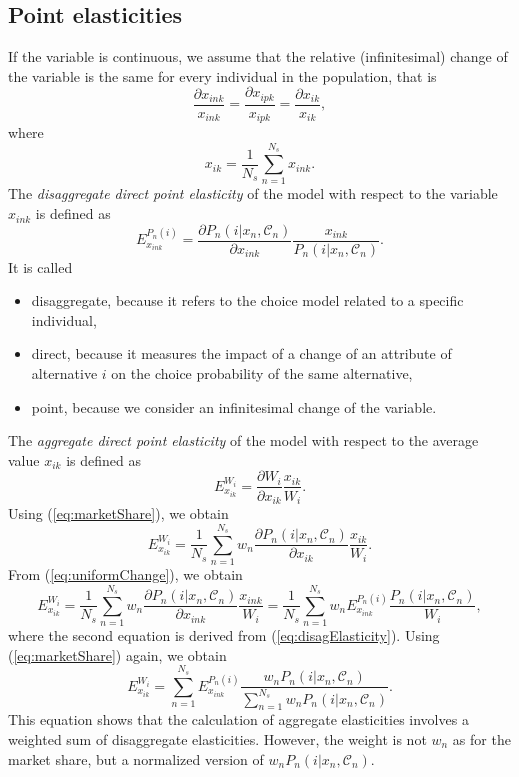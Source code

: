 \documentclass[12pt,a4paper]{article}
\newcommand{\req}[1]{(\ref{#1})}
\newcommand{\C}{\mathcal{C}}
\begin{document}
\subsection{Point elasticities}

If the variable is continuous, we assume that the relative (infinitesimal) change of
the variable is the same for every individual in the population,  that
is
\begin{equation}
  \label{eq:uniformChange}
\frac{\partial x_{ink}}{x_{ink}} = \frac{\partial x_{ipk}}{x_{ipk}} = 
\frac{\partial x_{ik}}{x_{ik}}, 
\end{equation}
where
\begin{equation}
  \label{eq:avgx}
x_{ik} = \frac{1}{N_s} \sum_{n=1}^{N_s}{x_{ink}}.
\end{equation}
The \emph{disaggregate direct point elasticity} of the model with respect to
the variable $x_{ink}$ is defined as
\begin{equation}
\label{eq:disagElasticity}
  E_{x_{ink}}^{P_n(i)} = \frac{\partial P_n(i|x_n, \C_n)}{\partial
  x_{ink}} \frac{x_{ink}}{P_n(i|x_n, \C_n)}.
\end{equation}
It is called
\begin{itemize}
\item disaggregate,  because it refers to the choice model related to a
  specific individual, 
\item direct,  because it measures the impact of a change of an
    attribute of alternative $i$ on the choice probability of the
    same alternative, 
\item point,  because we consider an infinitesimal change of the
  variable. 
\end{itemize}
The \emph{aggregate direct point elasticity} of the model with
respect to the average value $x_{ik}$ is defined as
\begin{equation}
E_{x_{ik}}^{W_i} = \frac{\partial W_i}{\partial x_{ik}} \frac{x_{ik}}{W_i}.
\end{equation}
Using \req{eq:marketShare},  we obtain
\begin{equation}
E_{x_{ik}}^{W_i} = \frac{1}{N_s}  \sum_{n=1}^{N_s} w_n \frac{\partial
  P_n(i|x_n, \C_n)}{\partial x_{ik}} \frac{x_{ik}}{W_i}.
\end{equation}
From \req{eq:uniformChange},  we obtain
\begin{equation}
E_{x_{ik}}^{W_i} = \frac{1}{N_s}  \sum_{n=1}^{N_s} w_n \frac{\partial
  P_n(i|x_n, \C_n)}{\partial x_{ink}} \frac{x_{ink}}{W_i} =
\frac{1}{N_s}  \sum_{n=1}^{N_s} w_n E_{x_{ink}}^{P_n(i)}  \frac{P_n(i|x_n, \C_n)}{W_i}, 
\end{equation}
where the second equation is derived from \req{eq:disagElasticity}.
Using \req{eq:marketShare} again,  we obtain
\begin{equation}
\label{eq:aggDisagg}
  E_{x_{ik}}^{W_i} =  \sum_{n=1}^{N_s} 
E_{x_{ink}}^{P_n(i)}  \frac{w_n P_n(i|x_n, \C_n)}{ \sum_{n=1}^{N_s} w_n P_n(i|x_n, \C_n)}.
\end{equation}
This equation shows that the calculation of aggregate elasticities
involves a weighted sum of disaggregate elasticities. However,  the
weight is not $w_n$ as for the market share,  but a normalized version
of $w_n P_n(i|x_n, \C_n)$.
\end{document}
